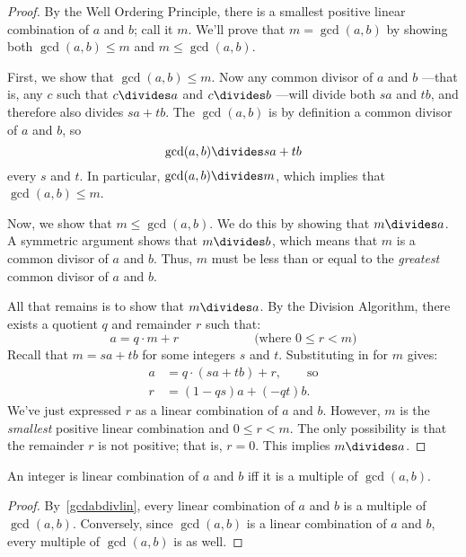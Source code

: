 \begin{proof}
By the Well Ordering Principle, there is a smallest positive linear
combination of $a$ and $b$; call it $m$.  We'll prove that $m = \gcd(a,
b)$ by showing both $\gcd(a, b) \leq m$ and $m \leq \gcd(a, b)$.

First, we show that $\gcd(a, b) \leq m$.  Now any common divisor of
$a$ and $b$ ---that is, any $c$ such that $c \divides a$ and
$c \divides b$ ---will divide both $sa$ and $tb$, and therefore also
divides $sa+tb$.  The $\gcd(a, b)$ is by definition a common divisor
of $a$ and $b$, so
%
\begin{equation}\label{gcdabdivlin}
\gcd(a, b) \divides s a + t b
\end{equation}
every $s$ and $t$.
%
In particular, $\gcd(a, b) \divides m$, which implies that $\gcd(a, b)
\leq m$.

Now, we show that $m \leq \gcd(a, b)$.  We do this by showing that $m
\divides a$.  A symmetric argument shows that $m \divides b$, which means
that $m$ is a common divisor of $a$ and $b$.  Thus, $m$ must be less than
or equal to the \emph{greatest} common divisor of $a$ and $b$.

All that remains is to show that $m \divides a$.  By the Division
Algorithm, there exists a quotient $q$ and remainder $r$ such that:
%
\[
a = q \cdot m + r \hspace{1in} \text{(where $0 \leq r < m$)}
\]
%
Recall that $m = s a + t b$ for some integers $s$ and $t$.
Substituting in for $m$ gives:
%
\begin{align*}
a & = q \cdot (s a + t b) + r, \qquad \text{so} \\
r & = (1 - qs) a + (-qt) b.
\end{align*}
%
We've just expressed $r$ as a linear combination of $a$ and $b$.
However, $m$ is the \emph{smallest} positive linear combination and
$0 \leq r < m$.  The only possibility is that the remainder $r$ is not
positive; that is, $r = 0$.  This implies $m \divides a$.
\end{proof}

\begin{corollary}\label{cor:lin-comb}
An integer is linear combination of $a$ and $b$ iff it is a multiple
of $\gcd(a, b)$.
\end{corollary}

\begin{proof}
By~\eqref{gcdabdivlin}, every linear combination of $a$ and $b$ is a
multiple of $\gcd(a, b)$.  Conversely, since $\gcd(a, b)$ is a linear
combination of $a$ and $b$, every multiple of $\gcd(a, b)$ is as well.
\end{proof}

